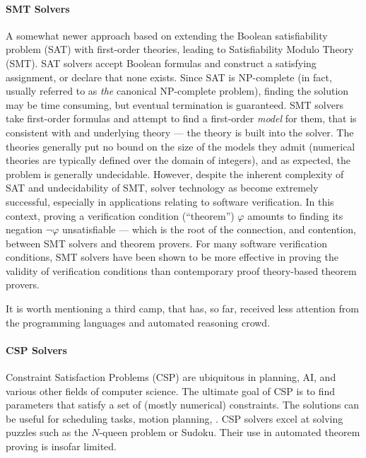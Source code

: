 \paragraph{SMT Solvers} A somewhat newer approach based on extending the
Boolean satisfiability problem (SAT) with first-order theories, leading to
Satisfiability Modulo Theory (SMT).
SAT solvers accept Boolean formulas and construct a satisfying assignment, or
declare that none exists.
Since SAT is NP-complete (in fact, usually referred to as \emph{the} canonical
NP-complete problem), finding the solution may be time consuming, but eventual
termination is guaranteed.
SMT solvers take first-order formulas and attempt to find a first-order
\emph{model} for them, that is consistent with and underlying theory --- the
theory is built into the solver.
The theories generally put no bound on the size of the models they admit
(\eg numerical theories are typically defined over the domain of integers),
and as expected, the problem is generally undecidable.
However, despite the inherent complexity of SAT and undecidability of SMT,
solver technology as become extremely successful, especially in applications
relating to software verification.
In this context, proving a verification condition (``theorem'') $\varphi$
amounts to finding its negation $\lnot\varphi$ unsatisfiable --- which is the root
of the connection, and contention, between SMT solvers and theorem provers.
For many software verification conditions, SMT solvers have been shown to be
more effective in proving the validity of verification conditions than
contemporary proof theory-based theorem provers.

It is worth mentioning a third camp, that has, so far, received less
attention from the programming languages and automated reasoning crowd.

\paragraph{CSP Solvers} Constraint Satisfaction Problems (CSP) are ubiquitous
in planning, AI, and various other fields of computer science.
The ultimate goal of CSP is to find parameters that satisfy a set of (mostly
numerical) constraints. The solutions can be useful for scheduling tasks,
motion planning, \etc.
CSP solvers excel at solving puzzles such as the $N$-queen problem or Sudoku.
Their use in automated theorem proving is insofar limited.

